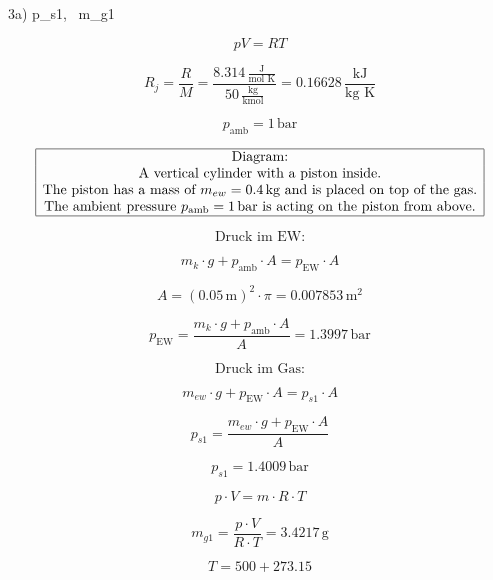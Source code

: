 3a) \quad p_{s1}, \, m_{g1}

\[
pV = RT
\]

\[
R_j = \frac{R}{M} = \frac{8.314 \, \frac{\text{J}}{\text{mol K}}}{50 \, \frac{\text{kg}}{\text{kmol}}} = 0.16628 \, \frac{\text{kJ}}{\text{kg K}}
\]

\[
p_{\text{amb}} = 1 \, \text{bar}
\]

\[
\begin{array}{|c|}
\hline
\text{Diagram:} \\
\text{A vertical cylinder with a piston inside.} \\
\text{The piston has a mass of } m_{ew} = 0.4 \, \text{kg} \text{ and is placed on top of the gas.} \\
\text{The ambient pressure } p_{\text{amb}} = 1 \, \text{bar} \text{ is acting on the piston from above.} \\
\hline
\end{array}
\]

\[
\text{Druck im EW:}
\]

\[
m_{k} \cdot g + p_{\text{amb}} \cdot A = p_{\text{EW}} \cdot A
\]

\[
A = (0.05 \, \text{m})^2 \cdot \pi = 0.007853 \, \text{m}^2
\]

\[
p_{\text{EW}} = \frac{m_{k} \cdot g + p_{\text{amb}} \cdot A}{A} = 1.3997 \, \text{bar}
\]

\[
\text{Druck im Gas:}
\]

\[
m_{ew} \cdot g + p_{\text{EW}} \cdot A = p_{s1} \cdot A
\]

\[
p_{s1} = \frac{m_{ew} \cdot g + p_{\text{EW}} \cdot A}{A}
\]

\[
p_{s1} = 1.4009 \, \text{bar}
\]

\[
p \cdot V = m \cdot R \cdot T
\]

\[
m_{g1} = \frac{p \cdot V}{R \cdot T} = 3.4217 \, \text{g}
\]

\[
T = 500 + 273.15
\]